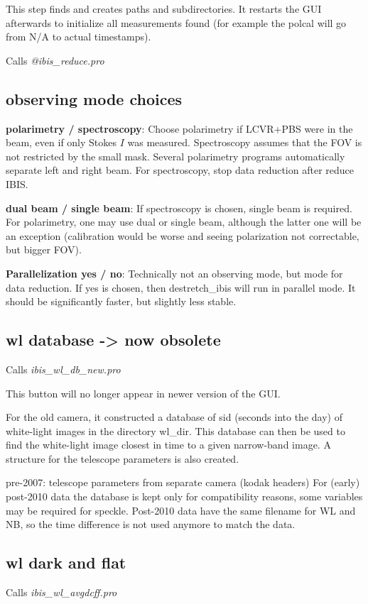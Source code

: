 \documentclass[a4paper,12pt]{article}
\begin{document}
This step finds and creates paths and subdirectories. It restarts the GUI afterwards to initialize all measurements found (for example the polcal will go from N/A to actual timestamps).

 Calls \textit{@ibis\_reduce.pro}
  
\subsection{observing mode choices}
\textbf{polarimetry / spectroscopy}: Choose polarimetry if LCVR+PBS were in the beam, even if only Stokes $I$ was measured. Spectroscopy assumes that the FOV is not restricted by the small mask. Several polarimetry programs automatically separate left and right beam. For spectroscopy, stop data reduction after reduce IBIS.

\textbf{dual beam / single beam}: If spectroscopy is chosen, single beam is required. For polarimetry, one may use dual or single beam, although the latter one will be an exception (calibration would be worse and seeing polarization not correctable, but bigger FOV).

\textbf{Parallelization yes / no}: Technically not an observing mode, but mode for data reduction. If yes is chosen, then destretch\_ibis will run in parallel mode. It should be significantly faster, but slightly less stable.

\subsection{wl database -> now obsolete}
Calls \textit{ibis\_wl\_db\_new.pro}

This button will no longer appear in newer version of the GUI.

For the old camera, it constructed a database of sid (seconds into the day) of white-light
images in the directory wl\_dir. This database can then be used
to find the white-light image closest in time to a given narrow-band
image. A structure for the telescope parameters is also created.

pre-2007: telescope parameters from separate camera (kodak headers)
For (early) post-2010 data the database is kept only for compatibility reasons, some variables may be required for speckle. Post-2010 data have the same filename for WL and NB, so the time difference is not used anymore to match the data.

\subsection{wl dark and flat}
Calls \textit{ibis\_wl\_avgdcff.pro}
\end{document}
